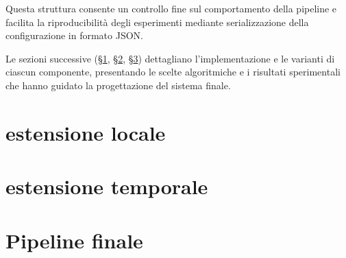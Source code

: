 Questa struttura consente un controllo fine sul comportamento della pipeline e facilita la riproducibilità degli esperimenti mediante serializzazione della configurazione in formato JSON.

Le sezioni successive (\S\ref{sec:estensione_locale}, \S\ref{sec:estensione_temporale}, \S\ref{sec:pipeline_finale}) dettagliano l'implementazione e le varianti di ciascun componente, presentando le scelte algoritmiche e i risultati sperimentali che hanno guidato la progettazione del sistema finale.


\section{estensione locale}\label{sec:estensione_locale} %


\section{estensione temporale}\label{sec:estensione_temporale} %


\section{Pipeline finale}\label{sec:pipeline_finale} %

